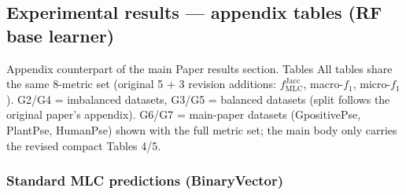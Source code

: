\documentclass[11pt]{article}
\begin{document}
\subsection{Experimental results --- appendix tables (RF base learner)}\label{sec:paperapp-rf}

Appendix counterpart of the main Paper results section. Tables All tables share the same 8-metric set (original 5 + 3 revision additions: $f^{\mathrm{Jacc}}_{\mathrm{MLC}}$, macro-$f_1$, micro-$f_1$). G2/G4 = imbalanced datasets, G3/G5 = balanced datasets (split follows the original paper's appendix). G6/G7 = main-paper datasets (GpositivePse, PlantPse, HumanPse) shown with the full metric set; the main body only carries the revised compact Tables 4/5.


\subsubsection{Standard MLC predictions (BinaryVector)}
\end{document}
